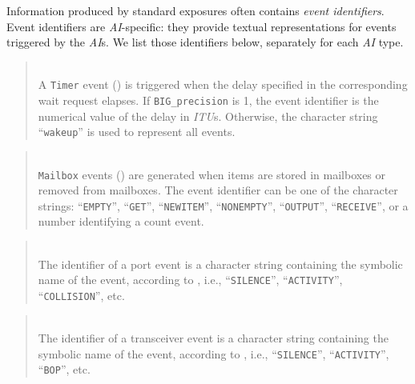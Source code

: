 Information produced by standard exposures often
contains {\em event identifiers}.
Event identifiers are {\em AI\/}-specific: they provide textual
representations for events triggered by the {\em AI\/}s.
We list those identifiers below, separately for each {\em AI\/} type.

\medskip

\begin{quote}
\noindent{} \hspace{0in}\vspace{0.05in}\\
\noindent
A {\tt Timer} event ()
is triggered when the delay specified in the corresponding
wait request elapses.
If {\tt BIG\_precision} is 1, the event identifier is the numerical value of
the delay in {\em ITU\/}s.
Otherwise, the character string ``{\tt wakeup}'' is used to represent all
events.
\end{quote}

\begin{quote}
\noindent{} \hspace{0in}\vspace{0.05in}\\
\noindent
{\tt Mailbox} events () are generated when items are stored
in mailboxes or removed from mailboxes.
The event identifier can be one of the character strings:
``{\tt EMPTY}'', ``{\tt GET}'',
``{\tt NEWITEM}'', ``{\tt NONEMPTY}'', ``{\tt OUTPUT}'', ``{\tt RECEIVE}'',
or a number identifying a count event.
\end{quote}

\begin{quote}
\noindent{} \hspace{0in}\vspace{0.05in}\\
\noindent
The identifier of a port event
is a character string containing the symbolic name of
the event, according to , i.e.,
``{\tt SILENCE}'', ``{\tt ACTIVITY}'', ``{\tt COLLISION}'', etc.
\end{quote}

\begin{quote}
\noindent{} \hspace{0in}\vspace{0.05in}\\
\noindent
The identifier of a transceiver event
is a character string containing the symbolic name of
the event, according to , i.e.,
``{\tt SILENCE}'', ``{\tt ACTIVITY}'', ``{\tt BOP}'', etc.
\end{quote}

